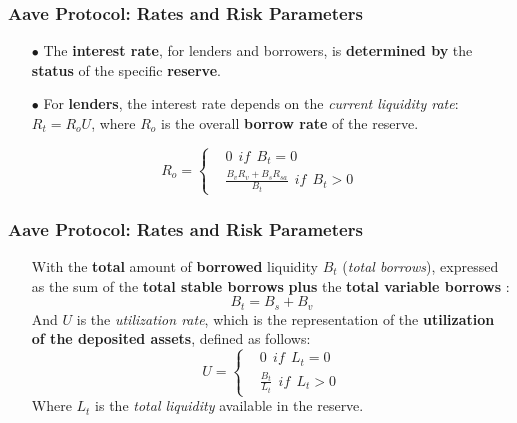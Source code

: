 \documentclass{beamer}
\begin{document}
\begin{frame}	
	\frametitle{Aave Protocol: Rates and Risk Parameters}
	\begin{itemize}
		\item[$\bullet$] The \textbf{interest rate}, for lenders and borrowers, is \textbf{determined by} the \textbf{status} of the specific \textbf{reserve}.
		\item[$\bullet$] For \textbf{lenders}, the interest rate depends on  the \textit{current liquidity rate}: $ R_{t} = R_{o}U $, where $ R_{o} $ is the overall \textbf{borrow rate} of the reserve.
	\end{itemize}
\begin{equation}
	R_{o} = 
	\left\{\begin{matrix}
		&  0~~if~~B_{t}=0\\ 
		& \frac{B_{v}R_{v}+ B_{s}R_{sa}}{B_{t}}~~if~~B_{t} > 0
	\end{matrix}\right.
\end{equation}
\end{frame}

\begin{frame}	
	\frametitle{Aave Protocol: Rates and Risk Parameters}
	\begin{itemize}
		\item[] With the \textbf{total} amount of \textbf{borrowed} liquidity $B_{t} $ (\textit{total borrows}), expressed as the sum of the \textbf{total stable borrows} \textbf{plus}  the \textbf{total variable borrows} :
		\[ B_{t} = B_{s}+B_{v} \]
		And $ U $ is the \textit{utilization rate}, which is the representation of the \textbf{utilization of the deposited assets}, defined as follows:
		\begin{equation}
			U = 
			\left\{\begin{matrix}
				&  0~~if~~L_{t}=0\\ 
				& \frac{B_{t}}{L_{t}}~~if~~L_{t} > 0
			\end{matrix}\right.
		\end{equation}
		Where $L_{t}$  is the \textit{total liquidity} available in the reserve.
	\end{itemize}

\end{frame}
\end{document}
